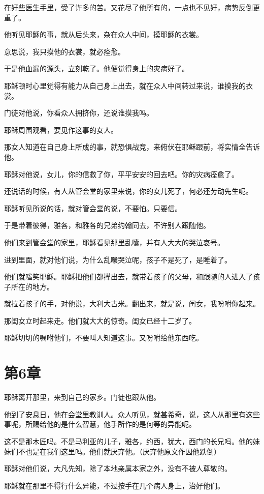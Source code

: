 \documentclass[12pt,oneside]{book}
\begin{document}
在好些医生手里，受了许多的苦。又花尽了他所有的，一点也不见好，病势反倒更重了。

他听见耶稣的事，就从后头来，杂在众人中间，摸耶稣的衣裳。

意思说，我只摸他的衣裳，就必痊愈。

于是他血漏的源头，立刻乾了。他便觉得身上的灾病好了。

耶稣顿时心里觉得有能力从自己身上出去，就在众人中间转过来说，谁摸我的衣裳。

门徒对他说，你看众人拥挤你，还说谁摸我吗。

耶稣周围观看，要见作这事的女人。

那女人知道在自己身上所成的事，就恐惧战竞，来俯伏在耶稣跟前，将实情全告诉他。

耶稣对他说，女儿，你的信救了你，平平安安的回去吧。你的灾病痊愈了。

还说话的时候，有人从管会堂的家里来说，你的女儿死了，何必还劳动先生呢。

耶稣听见所说的话，就对管会堂的说，不要怕。只要信。

于是带着彼得，雅各，和雅各的兄弟约翰同去，不许别人跟随他。

他们来到管会堂的家里，耶稣看见那里乱囔，并有人大大的哭泣哀号。

进到里面，就对他们说，为什么乱囔哭泣呢，孩子不是死了，是睡着了。

他们就嗤笑耶稣。耶稣把他们都撵出去，就带着孩子的父母，和跟随的人进入了孩子所在的地方。

就拉着孩子的手，对他说，大利大古米。翻出来，就是说，闺女，我吩咐你起来。

那闺女立时起来走。他们就大大的惊奇。闺女已经十二岁了。

耶稣切切的嘱咐他们，不要叫人知道这事。又吩咐给他东西吃。

\chapter{第6章}
耶稣离开那里，来到自己的家乡。门徒也跟从他。

他到了安息日，他在会堂里教训人。众人听见，就甚希奇，说，这人从那里有这些事呢，所赐给他的是什么智慧，他手所作的是何等的异能呢。

这不是那木匠吗。不是马利亚的儿子，雅各，约西，犹大，西门的长兄吗。他的妹妹们不也是在我们这里吗。他们就厌弃他。（厌弃他原文作因他跌倒）

耶稣对他们说，大凡先知，除了本地亲属本家之外，没有不被人尊敬的。

耶稣就在那里不得行什么异能，不过按手在几个病人身上，治好他们。
\end{document}

